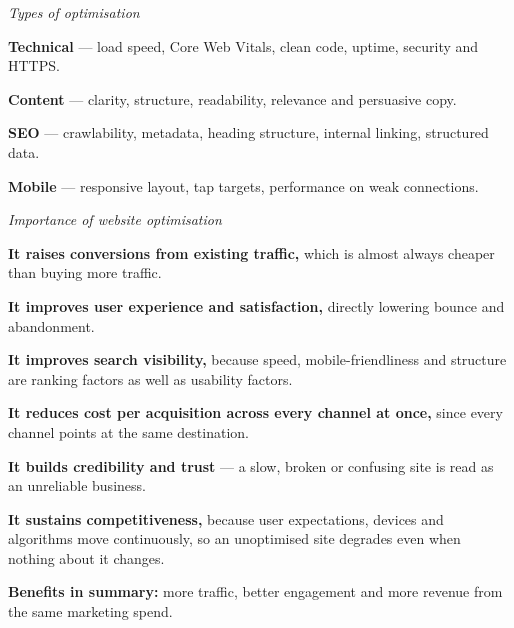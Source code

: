 \begin{qlist}
\textit{Types of optimisation}
\begin{apts}
\item \textbf{Technical} --- load speed, Core Web Vitals, clean code, uptime,
      security and HTTPS.
\item \textbf{Content} --- clarity, structure, readability, relevance and
      persuasive copy.
\item \textbf{SEO} --- crawlability, metadata, heading structure, internal
      linking, structured data.
\item \textbf{Mobile} --- responsive layout, tap targets, performance on weak
      connections.
\end{apts}

\textit{Importance of website optimisation}
\begin{apts}\setcounter{enumi}{4}
\item \textbf{It raises conversions from existing traffic,} which is almost
      always cheaper than buying more traffic.
\item \textbf{It improves user experience and satisfaction,} directly lowering
      bounce and abandonment.
\item \textbf{It improves search visibility,} because speed, mobile-friendliness
      and structure are ranking factors as well as usability factors.
\item \textbf{It reduces cost per acquisition across every channel at once,}
      since every channel points at the same destination.
\item \textbf{It builds credibility and trust} --- a slow, broken or confusing
      site is read as an unreliable business.
\item \textbf{It sustains competitiveness,} because user expectations, devices
      and algorithms move continuously, so an unoptimised site degrades even
      when nothing about it changes.
\end{apts}

\textbf{Benefits in summary:} more traffic, better engagement and more revenue
from the same marketing spend.


\end{qlist}
